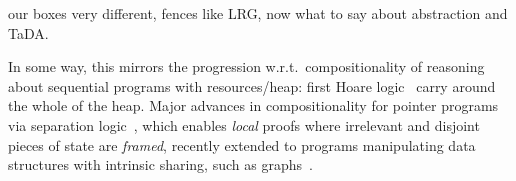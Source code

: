 
our boxes very different,  fences like LRG, now what to say about
abstraction and TaDA. 

In some way, this mirrors the progression w.r.t.\ compositionality of
reasoning about sequential programs with resources/heap: first Hoare
logic~\cite{hoarelogic} carry around the whole of the heap. Major
advances in compositionality for pointer programs via separation
logic~\cite{seplog}, which enables \emph{local} proofs where
irrelevant and disjoint pieces of state are \emph{framed}, recently
extended to programs manipulating data structures with intrinsic
sharing, such as graphs~\cite{ramification}.
